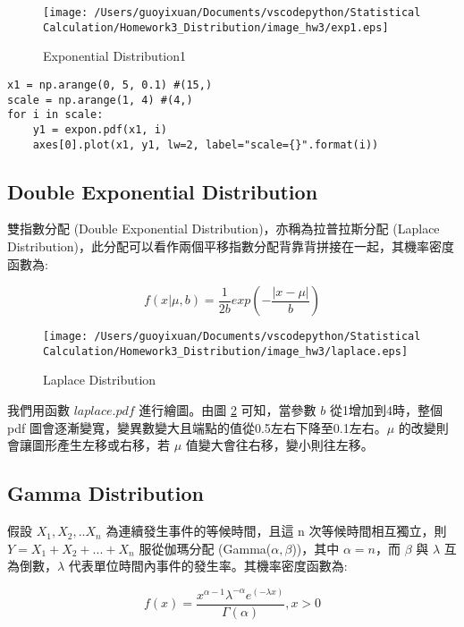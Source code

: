 \begin{figure}[H]
    \centering
        \texttt{[image: /Users/guoyixuan/Documents/vscodepython/Statistical Calculation/Homework3\_Distribution/image\_hw3/exp1.eps]}
    \caption{Exponential Distribution1}
    \label{Exponential Distribution1}
\end{figure}

\bigskip
\begin{lstlisting}
x1 = np.arange(0, 5, 0.1) #(15,)
scale = np.arange(1, 4) #(4,)
for i in scale:
    y1 = expon.pdf(x1, i)
    axes[0].plot(x1, y1, lw=2, label="scale={}".format(i))
\end{lstlisting}

\subsection{Double Exponential Distribution}

雙指數分配 (Double Exponential Distribution)，亦稱為拉普拉斯分配 (Laplace Distribution)，此分配可以看作兩個平移指數分配背靠背拼接在一起，其機率密度函數為:

\begin{equation}
f(x|\mu, b)=\frac{1}{2b}exp(-\frac{\left | x-\mu \right|}{b})
\end{equation}

\begin{figure}[H]
    \centering
        \texttt{[image: /Users/guoyixuan/Documents/vscodepython/Statistical Calculation/Homework3\_Distribution/image\_hw3/laplace.eps]}
    \caption{Laplace Distribution}
    \label{Laplace Distribution}
\end{figure}

我們用函數 $laplace.pdf$ 進行繪圖。由圖 \ref{Laplace Distribution} 可知，當參數 $b$ 從1增加到4時，整個 pdf 圖會逐漸變寬，變異數變大且端點的值從0.5左右下降至0.1左右。$\mu$ 的改變則會讓圖形產生左移或右移，若 $\mu$ 值變大會往右移，變小則往左移。

\subsection{Gamma Distribution}

假設 $X_1,X_2,..X_n$ 為連續發生事件的等候時間，且這 n 次等候時間相互獨立，則 $Y=X_1+X_2+...+X_n$ 服從伽瑪分配 (Gamma($\alpha,\beta$))，其中 $\alpha=n$，而 $\beta$ 與 $\lambda$ 互為倒數，$\lambda$ 代表單位時間內事件的發生率。其機率密度函數為:

\begin{equation}
f(x)=\frac{x^{\alpha -1} \lambda^{-\alpha}e^{(-\lambda x)}}{\Gamma(\alpha)}, x > 0
\end{equation}

